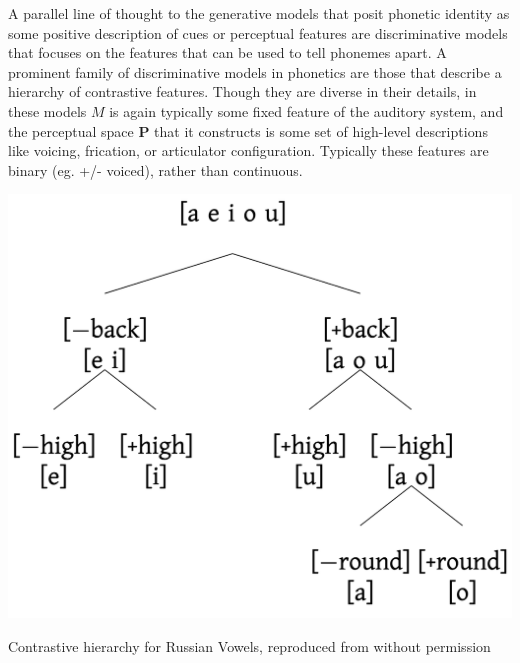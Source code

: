 
A parallel line of thought to the generative models that posit phonetic identity as some positive description of cues or perceptual features are discriminative models that focuses on the features that can be used to tell phonemes apart. A prominent family of discriminative models in phonetics are those that describe a hierarchy of contrastive features\citep{Dresher2008,clementsFeatureOrganization2006,halleFeatureSpreadingRepresentation2000}. Though they are diverse in their details, in these models $M$ is again typically some fixed feature of the auditory system, and the perceptual space $\mathbf{P}$ that it constructs is some set of high-level descriptions like voicing, frication, or articulator configuration. Typically these features are binary (eg. +/- voiced), rather than continuous.

\begin{marginfigure}
\includegraphics[]{modeling/figures/russian_vowel_hierarchy.png}
\caption{Contrastive hierarchy for Russian Vowels, reproduced from \citep{iosadVowelReductionRussian2012} without permission}
\label{fig:hierarchy}
\end{marginfigure}

